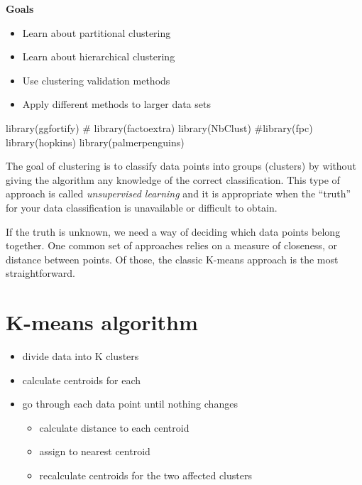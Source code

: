 \documentclass[
  letterpaper,
  DIV=11,
  numbers=noendperiod]{scrreprt}
\newenvironment{Shaded}{\begin{snugshade}}{\end{snugshade}}
\newcommand{\NormalTok}[1]{\textcolor[rgb]{0.00,0.23,0.31}{#1}}
\providecommand{\tightlist}{%
  \setlength{\itemsep}{0pt}\setlength{\parskip}{0pt}}\usepackage{longtable,booktabs,array}
\begin{document}
\textbf{Goals}

\begin{itemize}
\tightlist
\item
  Learn about partitional clustering
\item
  Learn about hierarchical clustering
\item
  Use clustering validation methods
\item
  Apply different methods to larger data sets
\end{itemize}

\begin{Shaded}
\begin{Highlighting}[]
\NormalTok{library(ggfortify) }
\NormalTok{\# library(factoextra) }
\NormalTok{library(NbClust)}
\NormalTok{\#library(fpc)}
\NormalTok{library(hopkins)}
\NormalTok{library(palmerpenguins)}
\end{Highlighting}
\end{Shaded}

The goal of clustering is to classify data points into groups (clusters)
by without giving the algorithm any knowledge of the correct
classification. This type of approach is called \emph{unsupervised
learning} and it is appropriate when the ``truth'' for your data
classification is unavailable or difficult to obtain.

If the truth is unknown, we need a way of deciding which data points
belong together. One common set of approaches relies on a measure of
closeness, or distance between points. Of those, the classic K-means
approach is the most straightforward.

\section{K-means algorithm}\label{k-means-algorithm}

\begin{itemize}
\tightlist
\item
  divide data into K clusters
\item
  calculate centroids for each
\item
  go through each data point until nothing changes

  \begin{itemize}
  \tightlist
  \item
    calculate distance to each centroid
  \item
    assign to nearest centroid
  \item
    recalculate centroids for the two affected clusters
  \end{itemize}
\end{itemize}
\end{document}
